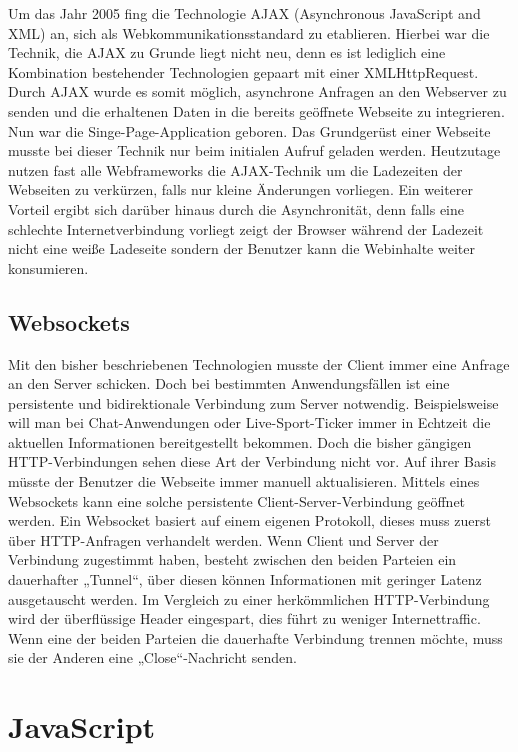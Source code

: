 Um das Jahr 2005 fing die Technologie AJAX (Asynchronous JavaScript and XML) an, sich als Webkommunikationsstandard zu etablieren. Hierbei war die Technik, die AJAX zu Grunde liegt nicht neu, denn es ist lediglich eine Kombination bestehender Technologien gepaart mit einer XMLHttpRequest. Durch AJAX wurde es somit möglich, asynchrone Anfragen an den Webserver zu senden und die erhaltenen Daten in die bereits geöffnete Webseite zu integrieren. Nun war die Singe-Page-Application geboren. Das Grundgerüst einer Webseite musste bei dieser Technik nur beim initialen Aufruf geladen werden. Heutzutage nutzen fast alle Webframeworks die AJAX-Technik um die Ladezeiten der Webseiten zu verkürzen, falls nur kleine Änderungen vorliegen. Ein weiterer Vorteil ergibt sich darüber hinaus durch die Asynchronität, denn falls eine schlechte Internetverbindung vorliegt zeigt der Browser während der Ladezeit nicht eine weiße Ladeseite sondern der Benutzer kann die Webinhalte weiter konsumieren.\autocites[vgl.][4]{Fink2014}[vgl.][7\psqq]{Jaeger2008}

\subsection{Websockets}

Mit den bisher beschriebenen Technologien musste der Client immer eine Anfrage an den Server schicken. Doch bei bestimmten Anwendungsfällen ist eine persistente und bidirektionale Verbindung zum Server notwendig. Beispielsweise will man bei Chat-Anwendungen oder Live-Sport-Ticker immer in Echtzeit die aktuellen Informationen bereitgestellt bekommen. Doch die bisher gängigen HTTP-Verbindungen sehen diese Art der Verbindung nicht vor. Auf ihrer Basis müsste der Benutzer die Webseite immer manuell aktualisieren. Mittels eines Websockets kann eine solche persistente Client-Server-Verbindung geöffnet werden. Ein Websocket basiert auf einem eigenen Protokoll, dieses muss zuerst über HTTP-Anfragen verhandelt werden. Wenn Client und Server der Verbindung zugestimmt haben, besteht zwischen den beiden Parteien ein dauerhafter „Tunnel“, über diesen können Informationen mit geringer Latenz ausgetauscht werden. Im Vergleich zu einer herkömmlichen HTTP-Verbindung wird der überflüssige Header eingespart, dies führt zu weniger Internettraffic. Wenn eine der beiden Parteien die dauerhafte Verbindung trennen möchte, muss sie der Anderen eine „Close“-Nachricht senden.\autocites[vgl.][11\psqq]{Fink2014}

\section{JavaScript}\label{sec:js}

